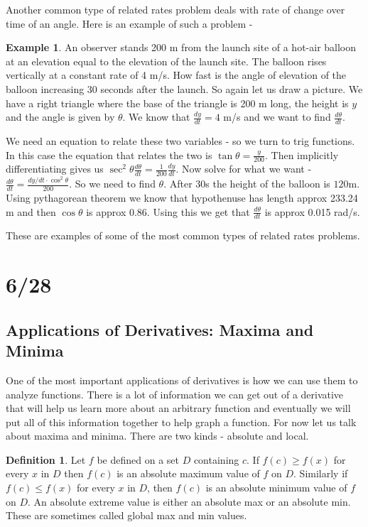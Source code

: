 \documentclass[12pt,reqno]{article}
\theoremstyle{definition}
\newtheorem*{Definition}{Definition}
\newtheorem*{Example}{Example}
\begin{document}
Another common type of related rates problem deals with rate of change over time of an angle. Here is an example of such a problem - 
\begin{Example}
	An observer stands 200 m from the launch site of a hot-air balloon at an elevation equal to the elevation of the launch site. The balloon rises vertically at a constant rate of 4 m/s. How fast is the angle of elevation of the balloon increasing 30 seconds after the launch. 
	So again let us draw a picture. We have a right triangle where the base of the triangle is 200 m long, the height is $y$ and the angle is given by $\theta$. We know that $\frac{dy}{dt} = 4$ m/s and we want to find $\frac{d\theta}{dt}$. 
	
	We need an equation to relate these two variables - so we turn to trig functions. In this case the equation that relates the two is $\tan \theta = \frac{y}{200}$. Then implicitly differentiating gives us $\sec^2 \theta \frac{d\theta}{dt} = \frac{1}{200}\frac{dy}{dt}$. Now solve for what we want - $\frac{d\theta}{dt} = \frac{dy/dt \cdot \cos^2 \theta}{200}$. So we need to find $\theta.$ After 30s the height of the balloon is $120$m. Using pythagorean theorem we know that hypothenuse has length approx 233.24 m and then $\cos \theta$ is approx 0.86. Using this we get that $\frac{d\theta}{dt}$ is approx 0.015 rad/s. 
\end{Example}

These are examples of some of the most common types of related rates problems. 

\section{6/28}
\subsection{Applications of Derivatives: Maxima and Minima}

One of the most important applications of derivatives is how we can use them to analyze functions. There is a lot of information we can get out of a derivative that will help us learn more about an arbitrary function and eventually we will put all of this information together to help graph a function. For now let us talk about maxima and minima. There are two kinds - absolute and local. 
\begin{Definition}
	Let $f$ be defined on a set $D$ containing $c$. If $f(c) \geq f(x)$ for every $x$ in $D$ then $f(c)$ is an absolute maximum value of $f$ on $D$. Similarly if $f(c) \leq f(x)$ for every $x$ in $D$, then $f(c)$ is an absolute minimum value of $f$ on $D$. An absolute extreme value is either an absolute max or an absolute min. These are sometimes called global max and min values.
\end{Definition}
\end{document}
